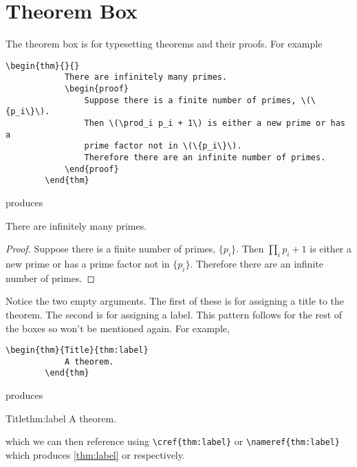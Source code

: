 \documentclass[fleqn, a4paper, openany]{memoir}
\begin{document}
    \section{Theorem Box}
    The theorem box is for typesetting theorems and their proofs.
    For example
    \begin{Verbatim}[gobble=2]
        \begin{thm}{}{}
            There are infinitely many primes.
            \begin{proof}
                Suppose there is a finite number of primes, \(\{p_i\}\).
                Then \(\prod_i p_i + 1\) is either a new prime or has a
                prime factor not in \(\{p_i\}\).
                Therefore there are an infinite number of primes.
            \end{proof}
        \end{thm}
    \end{Verbatim}
    produces
    \begin{thm}{}{}
        There are infinitely many primes.
        \begin{proof}
            Suppose there is a finite number of primes, \(\{p_i\}\).
            Then \(\prod_i p_i + 1\) is either a new prime or has a prime factor not in \(\{p_i\}\).
            Therefore there are an infinite number of primes.
        \end{proof}
    \end{thm}
    Notice the two empty arguments.
    The first of these is for assigning a title to the theorem.
    The second is for assigning a label.
    This pattern follows for the rest of the boxes so won't be mentioned again.
    For example,
    \begin{Verbatim}[gobble=2]
        \begin{thm}{Title}{thm:label}
            A theorem.
        \end{thm}
    \end{Verbatim}
    produces
    \begin{thm}{Title}{thm:label}
        A theorem.
    \end{thm}
    which we can then reference using \verb*|\cref{thm:label}| or \verb*|\nameref{thm:label}| which produces \cref{thm:label} or  respectively.
    
\end{document}
